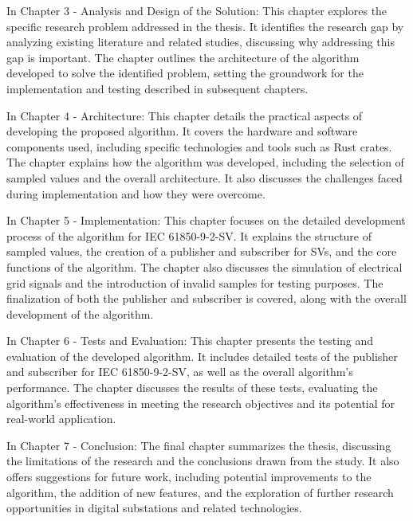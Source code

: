 In Chapter 3 - Analysis and Design of the Solution: This chapter explores the specific research problem addressed in the thesis. It identifies the research gap by analyzing existing literature and related studies, discussing why addressing this gap is important. The chapter outlines the architecture of the algorithm developed to solve the identified problem, setting the groundwork for the implementation and testing described in subsequent chapters.

In Chapter 4 - Architecture: This chapter details the practical aspects of developing the proposed algorithm. It covers the hardware and software components used, including specific technologies and tools such as Rust crates. The chapter explains how the algorithm was developed, including the selection of sampled values  and the overall architecture. It also discusses the challenges faced during implementation and how they were overcome.

In Chapter 5 - Implementation: This chapter focuses on the detailed development process of the algorithm for IEC 61850-9-2-SV. It explains the structure of sampled values, the creation of a publisher and subscriber for SVs, and the core functions of the algorithm. The chapter also discusses the simulation of electrical grid signals and the introduction of invalid samples for testing purposes. The finalization of both the publisher and subscriber is covered, along with the overall development of the algorithm.

In Chapter 6 - Tests and Evaluation: This chapter presents the testing and evaluation of the developed algorithm. It includes detailed tests of the publisher and subscriber for IEC 61850-9-2-SV, as well as the overall algorithm's performance. The chapter discusses the results of these tests, evaluating the algorithm's effectiveness in meeting the research objectives and its potential for real-world application.

In Chapter 7 - Conclusion: The final chapter summarizes the thesis, discussing the limitations of the research and the conclusions drawn from the study. It also offers suggestions for future work, including potential improvements to the algorithm, the addition of new features, and the exploration of further research opportunities in digital substations and related technologies.
